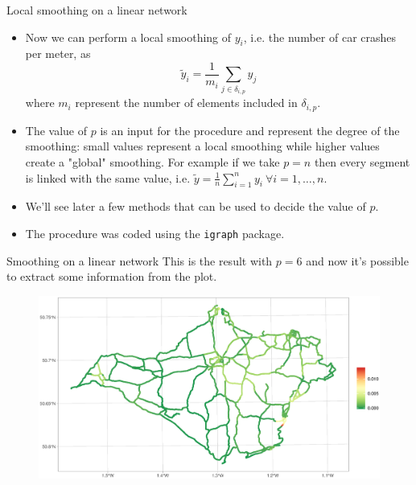 \documentclass[c,10pt,pdftex]{beamer}
\begin{document}
\begin{frame}{Local smoothing on a linear network}
\vspace{-0.5cm}
\begin{itemize}
	\setlength\itemsep{1em}
	\item Now we can perform a local smoothing of $y_i$, i.e. the number of car crashes per meter, as
	\[
	\tilde{y}_i = \frac{1}{m_i}\sum_{j \in \delta_{i, p}} y_{j} 
	\]
	where $m_i$ represent the number of elements included in $\delta_{i, p}$. 
	
	\item The value of $p$ is an input for the procedure and represent the degree of the smoothing: small values represent a local smoothing while higher values create a "global" smoothing. For example if we take $p = n$ then every segment is linked with the same value, i.e. $\tilde{y} = \frac{1}{n}\sum_{i=1}^{n}y_{i} \ \forall i = 1, \dots, n$. 
	
	\item We'll see later a few methods that can be used to decide the value of $p$. 
	\item The procedure was coded using the \texttt{igraph} package.
\end{itemize}
\end{frame}

\begin{frame}{Smoothing on a linear network}
\vspace{-0.25cm}
This is the result with $p = 6$ and now it's possible to extract some information from the plot. 
\begin{figure}
	\centering
	\includegraphics[width=\linewidth]{images/car_crashes_per_meter_smooth6}
\end{figure}
\end{frame}
\end{document}
